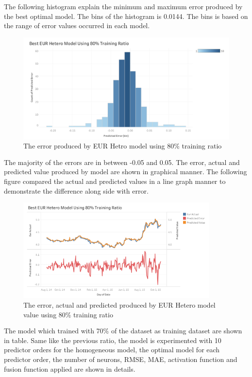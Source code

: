 {{{{{{{{{{{{{The following histogram explain the minimum and maximum error produced by the best optimal model. The bins of the histogram is 0.0144. The bins is based on the range of error values occurred in each model.
	
	\begin{figure}[hbt!]\centering
		\includegraphics[width=1\textwidth]{hetro_eur_80}
		\caption{The error produced by EUR Hetro model using 80\% training ratio}
	\end{figure}
	\pagebreak
	
The majority of the errors are in between -0.05 and 0.05. The error, actual and predicted value produced by model are shown  in graphical manner. The following figure compared the actual and predicted values in a line graph manner to demonstrate the difference along side with error.
	
	
	\begin{figure}[hbt!]\centering
		\includegraphics[width=0.9\textwidth]{best_eur_hetero_APV_80}
		\caption{The error, actual and predicted produced by EUR Hetero model  value using 80\% training ratio }
	\end{figure}
	\pagebreak
	
	
The model which trained with 70\% of the dataset as training dataset are shown in table. Same like the previous ratio, the model is  experimented with 10 predictor orders for the homogeneous model, the optimal model for each predictor order, the number of neurons, RMSE, MAE, activation function and fusion function applied are shown in details.
	
}}}}}}}}}}}}}

